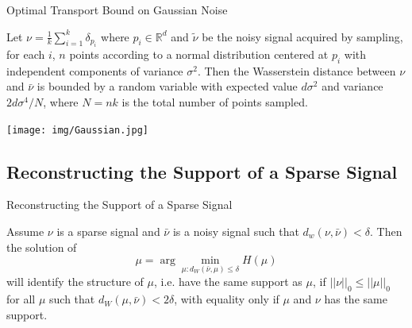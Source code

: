 \documentclass{beamer}
\begin{document}
\begin{frame}{Optimal Transport Bound on Gaussian Noise}
\begin{theorem}
Let $\nu = \frac{1}{k}\sum_{i=1}^k \delta_{p_i}$ where $p_i\in \mathbb R^d$ and $\tilde\nu$ be the noisy signal acquired by sampling, for each $i$, $n$ points according to a normal distribution centered at $p_i$ with independent components of variance $\sigma^2$. \pause
Then the Wasserstein distance between $\nu$ and $\bar\nu$ is bounded by a random variable with expected value $d\sigma^2$ and variance $2d\sigma^4/N$,  where $N=nk$ is the total number of points sampled.  
\end{theorem}
\pause

\centerline{\texttt{[image: img/Gaussian.jpg]}}

\end{frame}

\subsection{Reconstructing the Support of a Sparse Signal}

\begin{frame}{Reconstructing the Support of a Sparse Signal}

\begin{theorem}
    \label{thm1}
    Assume $\nu$ is a sparse signal and $\bar\nu$ is a noisy signal such that 
    $d_w(\nu,\bar\nu) < \delta $. \pause
    Then the solution of 
    \begin{equation*} \label{eq:dualConstraint} 
        \mu=\arg\min_{\mu : d_W(\bar\nu,\mu) \le \delta} H(\mu) 
    \end{equation*} 
    will identify the structure of $\mu$, i.e. have the same support as $\mu$, if $||\nu||_0 \leq ||\mu||_0$ for all $\mu$ such that $d_W(\mu,\bar\nu)<2\delta$, with equality only if $\mu$ and $\nu$ has the same support.  
\end{theorem}

\end{frame}
\end{document}
